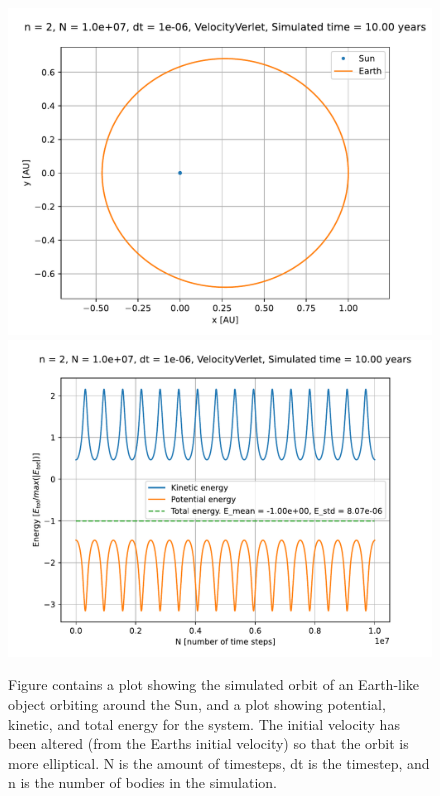 \documentclass[reprint,english,notitlepage]{revtex4-1}  %
\begin{document}
\begin{figure}[H]
\includegraphics[width=\columnwidth]{../data/figures/varyingbeta/se_peturbed_beta2_vv_orbits2D.pdf}
\includegraphics[width=\columnwidth]{../data/figures/varyingbeta/se_peturbed_beta2_vv_energy.pdf}
\caption{Figure contains a plot showing the simulated orbit of an Earth-like object orbiting around the Sun, and a plot showing potential, kinetic, and total energy for the system. The initial velocity has been altered (from the Earths initial velocity) so that the orbit is more elliptical. N is the amount of timesteps, dt is the timestep, and n is the number of bodies in the simulation.}
\label{fig:beta2_peturbed}
\end{figure}
\end{document}
